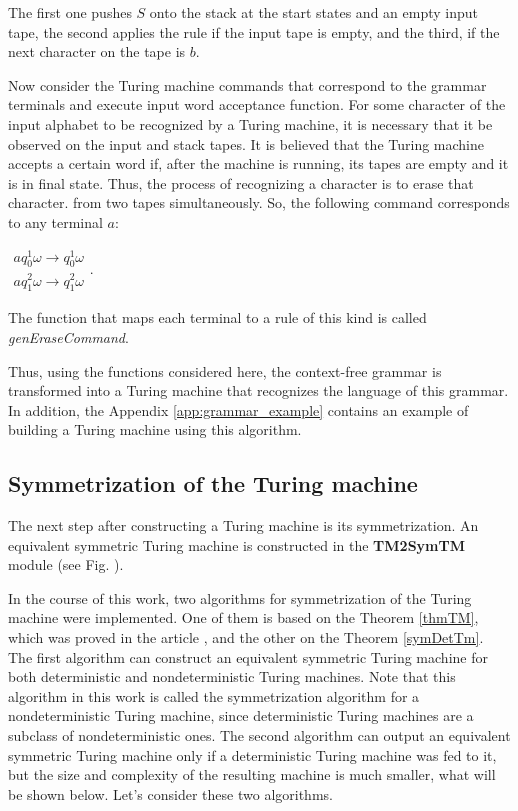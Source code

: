 \documentclass[conference]{IEEEtran}
\theoremstyle{definition}
\begin{document}
The first one pushes $ S $ onto the stack at the start states and an empty input tape, the second applies the rule if the input tape is empty, and the third, if the next character on the tape is $ b $.

Now consider the Turing machine commands that correspond to the grammar terminals and execute
input word acceptance function. For some character of the input alphabet to be recognized
by a Turing machine, it is necessary that it be observed on the input and stack tapes. It is believed that
the Turing machine accepts a certain word if, after the machine is running, its tapes are empty and it is in
final state. Thus, the process of recognizing a character is to erase that character.
from two tapes simultaneously. So, the following command corresponds to any terminal $ a $:

$\begin{array}{lcl}
    a q_0^1 \omega \to q_0^1 \omega \\
    a q_1^2 \omega \to q_1^2 \omega 
\end{array}$. 

The function that maps each terminal to a rule of this kind is called \textit{genEraseCommand}.

Thus, using the functions considered here, the context-free grammar is transformed into a Turing machine that recognizes the language of this grammar. In addition, the Appendix \ref{app:grammar_example} contains an example of building a Turing machine using this algorithm.

\subsection{Symmetrization of the Turing machine}

The next step after constructing a Turing machine is its symmetrization. An equivalent symmetric Turing machine is constructed in the \textbf{TM2SymTM} module (see Fig. ).

In the course of this work, two algorithms for symmetrization of the Turing machine were implemented. One of them is based on the Theorem \ref{thmTM}, which was proved in the article \cite{Sapir}, and the other on the Theorem \ref{symDetTm}. The first algorithm can construct an equivalent symmetric Turing machine for both deterministic and nondeterministic Turing machines. Note that this algorithm in this work is called the symmetrization algorithm for a nondeterministic Turing machine, since deterministic Turing machines are a subclass of nondeterministic ones. The second algorithm can output an equivalent symmetric Turing machine only if a deterministic Turing machine was fed to it, but the size and complexity of the resulting machine is much smaller, what will be shown below. Let's consider these two algorithms.
\end{document}
